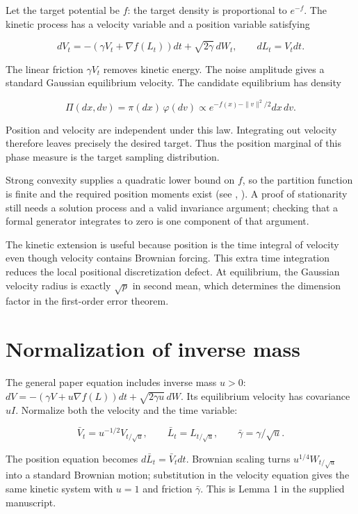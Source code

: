 \documentclass[11pt,a4paper]{report}
\begin{document}
Let the target potential be \(f\): the target density is proportional to \(e^{-f}\). The kinetic process has a velocity variable and a position variable satisfying


\[dV_t=-(\gamma V_t+\nabla f(L_t))dt+\sqrt{2\gamma}\,dW_t,
\qquad dL_t=V_tdt.\]


The linear friction \(\gamma V_t\) removes kinetic energy. The noise amplitude gives a standard Gaussian equilibrium velocity.
The candidate equilibrium has density


\[\Pi(dx,dv)=\pi(dx)\,\varphi(dv)
\propto e^{-f(x)-\|v\|^2/2}dx\,dv.\]


Position and velocity are independent under this law. Integrating out velocity
therefore leaves precisely the desired target. Thus the position marginal of this phase measure is the target sampling distribution.




Strong convexity supplies a quadratic lower bound on \(f\), so the partition
function is finite and the required position moments exist (see \cite[Section~3.26.10]{LangevinLean2026ULASC}, \cite[Section~3.26.15]{LangevinLean2026ULASC}). A proof of
stationarity still needs a solution process and a valid invariance
argument; checking that a formal generator integrates to zero is one component
of that argument.



The kinetic extension is useful because position is the time integral of velocity even though velocity contains Brownian forcing. This extra time integration reduces the local positional discretization defect. At equilibrium, the Gaussian velocity radius is exactly \(\sqrt p\) in second mean, which determines the dimension factor in the first-order error theorem.

\section{\texorpdfstring{Normalization of inverse mass}{Normalization of inverse mass}}


The general paper equation includes inverse mass \(u>0\):
\(dV=-(\gamma V+u\nabla f(L))dt+\sqrt{2\gamma u}\,dW\).
Its equilibrium velocity has covariance \(uI\). Normalize both the velocity
and the time variable:


\[\bar V_t=u^{-1/2}V_{t/\sqrt u},\qquad
\bar L_t=L_{t/\sqrt u},\qquad \bar\gamma=\gamma/\sqrt u.\]


The position equation becomes \(d\bar L_t=\bar V_tdt\). Brownian scaling
turns \(u^{1/4}W_{t/\sqrt u}\) into a standard Brownian motion; substitution
in the velocity equation gives the same kinetic system with \(u=1\) and
friction \(\bar\gamma\). This is Lemma 1 in the supplied manuscript.
\end{document}
